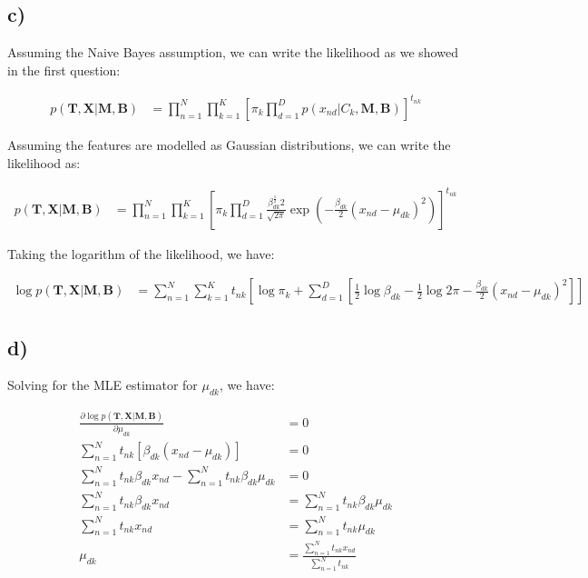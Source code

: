 \documentclass[12pt,a4paper,oneside]{paper}
\begin{document}
\subsection*{c)}

Assuming the Naive Bayes assumption, we can write the likelihood as we showed in the first question:

\begin{align*}
    p(\bm{T}, \bm{X} | \bm{M}, \bm{B}) &= \prod_{n=1}^{N} \prod_{k=1}^{K} [\pi_k \prod_{d=1}^{D} p(x_{nd} | C_k, \bm{M}, \bm{B})]^{t_{nk}}
\end{align*}

Assuming the features are modelled as Gaussian distributions, we can write the likelihood as:

\begin{align*}
    p(\bm{T}, \bm{X} | \bm{M}, \bm{B}) &= \prod_{n=1}^{N} \prod_{k=1}^{K} [\pi_k \prod_{d=1}^{D} \frac{\beta_{dk}^{\frac{1}{2}}{2}}{\sqrt{2\pi}} \exp\left(-\frac{\beta_{dk}}{2} (x_{nd} - \mu_{dk})^2\right)]^{t_{nk}}
\end{align*}

Taking the logarithm of the likelihood, we have:

\begin{align*}
    \log p(\bm{T}, \bm{X} | \bm{M}, \bm{B}) &= \sum_{n=1}^{N} \sum_{k=1}^{K} t_{nk} \left[\log \pi_k + \sum_{d=1}^{D} \left[\frac{1}{2} \log \beta_{dk} - \frac{1}{2} \log 2\pi - \frac{\beta_{dk}}{2} (x_{nd} - \mu_{dk})^2\right]\right]
\end{align*}

\subsection*{d)}

Solving for the MLE estimator for $\mu_{dk}$, we have:

\begin{align*}
    \frac{\partial \log p(\bm{T}, \bm{X} | \bm{M}, \bm{B})}{\partial \mu_{dk}} &= 0 \\
    \sum_{n=1}^{N} t_{nk} \left[\beta_{dk} (x_{nd} - \mu_{dk})\right] &= 0 \\
    \sum_{n=1}^{N} t_{nk} \beta_{dk} x_{nd} - \sum_{n=1}^{N} t_{nk} \beta_{dk} \mu_{dk} &= 0 \\
    \sum_{n=1}^{N} t_{nk} \beta_{dk} x_{nd} &= \sum_{n=1}^{N} t_{nk} \beta_{dk} \mu_{dk} \\
    \sum_{n=1}^{N} t_{nk} x_{nd} &= \sum_{n=1}^{N} t_{nk} \mu_{dk} \\
    \mu_{dk} &= \frac{\sum_{n=1}^{N} t_{nk} x_{nd}}{\sum_{n=1}^{N} t_{nk}}
\end{align*}
\end{document}
